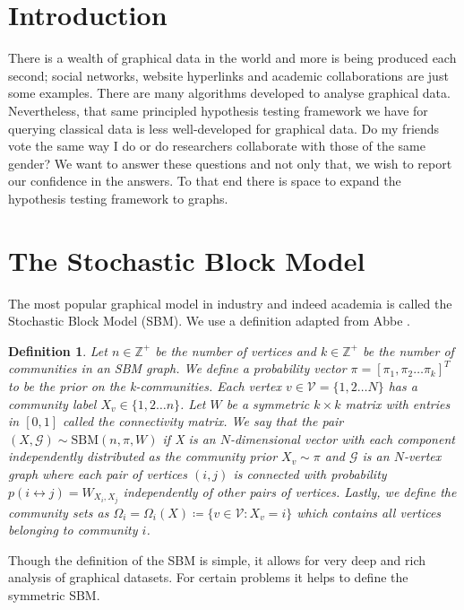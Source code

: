 \documentclass[]{article}
\newcommand{\Gcal}{\mathcal{G}}
\newcommand{\Vcal}{\mathcal{V}}
\newcommand{\Integers}{\mathbb{Z}}
\newtheorem{definition}{Definition}[section]
\begin{document}
\begin{multicols*}{2}

\section{Introduction}

There is a wealth of graphical data in the world and more is being produced each second; social networks, website hyperlinks and academic collaborations are just some examples. There are many algorithms developed to analyse graphical data. Nevertheless, that same principled hypothesis testing framework we have for querying classical data is less well-developed for graphical data. Do my friends vote the same way I do or do researchers collaborate with those of the same gender? We want to answer these questions and not only that, we wish to report our confidence in the answers. To that end there is space to expand the hypothesis testing framework to graphs.

\section{The Stochastic Block Model}

The most popular graphical model in industry and indeed academia is called the Stochastic Block Model (SBM). We use a definition adapted from Abbe \cite{Abbe}.

\begin{definition}
	\label{defn:sbm}
	Let $n \in \Integers^+$ be the number of vertices and $k \in \Integers^+$ be the number of communities in an SBM graph. We define a probability vector $\pi = [\pi_1, \pi_2 \dots \pi_k]^T$ to be the prior on the k-communities. Each vertex $v \in \Vcal = \{1, 2 \dots N\}$ has a community label $X_v \in \{1, 2 \dots n\}$. Let $W$ be a symmetric $k \times k$ matrix with entries in $[0,1]$ called the connectivity matrix. We say that the pair $(X, \Gcal) \sim \textrm{SBM}(n, \pi, W)$ if X is an $N$-dimensional vector with each component independently distributed as the community prior $X_v \sim \pi$ and $\Gcal$ is an $N$-vertex graph where each pair of vertices $(i, j)$ is connected with probability $p(i \leftrightarrow j) = W_{X_i, X_j}$ independently of other pairs of vertices. Lastly, we define the community sets as $\Omega_i = \Omega_i(X) \coloneqq \{v \in \Vcal : X_v = i\}$ which contains all vertices belonging to community $i$.
\end{definition}

Though the definition of the SBM is simple, it allows for very deep and rich analysis of graphical datasets. For certain problems it helps to define the symmetric SBM.


\end{multicols*}
\end{document}
